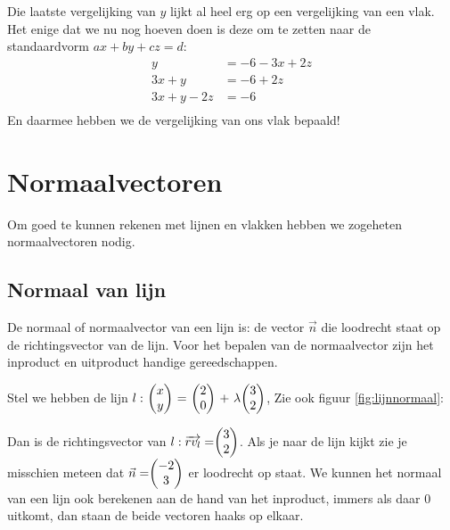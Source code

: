 Die laatste vergelijking van $y$ lijkt al heel erg op een vergelijking van een vlak. Het enige dat we nu nog hoeven doen is deze om te zetten naar de standaardvorm $ax + by + cz = d$:
\begin{align*}
  y &= -6 -3x + 2z \\
  3x + y &= -6 + 2z \\
  3x + y - 2z &= -6 \\
\end{align*}
En daarmee hebben we de vergelijking van ons vlak bepaald!

\section{Normaalvectoren}
Om goed te kunnen rekenen met lijnen en vlakken hebben we zogeheten normaalvectoren nodig.

\subsection{Normaal van lijn}
{De normaal of normaalvector van een lijn is: de vector $\vec{n} $ die loodrecht staat op de richtingsvector van de lijn.} Voor het bepalen van de normaalvector zijn het inproduct en uitproduct handige gereedschappen. 

Stel we hebben de lijn $l:\ \vectwee{x}{y} \ = \ \vectwee{2}{0} \ +\ \lambda \vectwee{3}{2} $, Zie ook figuur \ref{fig:lijnnormaal}:


Dan is de richtingsvector van $ l:  \overrightarrow{rv_{l}} =  \vectwee {3}{2} $. Als je naar de lijn kijkt zie je misschien meteen dat $ \vec{n} =  \vectwee {-2}{3} $ er loodrecht op staat. 
We kunnen het normaal van een lijn ook berekenen aan de hand van het inproduct, immers als daar $0$ uitkomt, dan staan de beide vectoren haaks op elkaar. 

